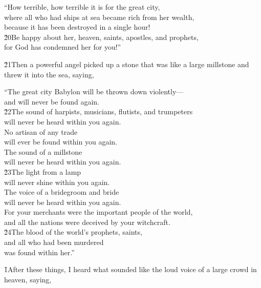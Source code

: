 \begin{poetry}
\poeml ``How terrible, how terrible it is for the great city, \\
\poemll    where all who had ships at sea became rich from her wealth, \\
\poemlll       because it has been destroyed in a single hour! \\
\poeml \v{20}Be happy about her, heaven, saints, apostles, and prophets, \\
\poemll    for God has condemned her for you!''
\end{poetry}

\v{21}Then a powerful angel picked up a stone that was like a large millstone and threw it into the sea, saying,

\begin{poetry}
\poeml ``The great city Babylon will be thrown down violently--- \\
\poemll    and will never be found again. \\
\poeml \v{22}The sound of harpists, musicians, flutists, and trumpeters \\
\poemll    will never be heard within you again. \\
\poeml No artisan of any trade \\
\poemll    will ever be found within you again. \\
\poeml The sound of a millstone \\
\poemll    will never be heard within you again. \\
\poeml \v{23}The light from a lamp \\
\poemll    will never shine within you again. \\
\poeml The voice of a bridegroom and bride \\
\poemll    will never be heard within you again. \\
\poeml For your merchants were the important people of the world, \\
\poemll    and all the nations were deceived by your witchcraft. \\
\poeml \v{24}The blood of the world's prophets, saints, \\
\poemll    and all who had been murdered \\
\poemlll       was found within her.''
\end{poetry}

\v{1}After these things, I heard what sounded like the loud voice of a large crowd in heaven, saying,

